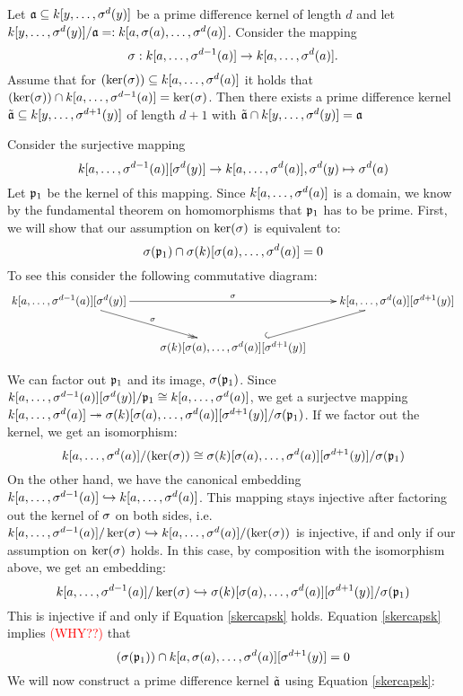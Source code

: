  
\begin{prop}
Let $\mathfrak{a} \subseteq k[y,\ldots,\sigma^d(y)]$ be a prime difference kernel of length $d$ and let $k[y,\ldots,\sigma^d(y)]/\mathfrak{a} =: k[a,\sigma(a),\ldots,\sigma^d(a)]$. Consider the mapping 
\[ \sigma: k[a,\ldots,\sigma^{d-1}(a)] \rightarrow k[a,\ldots,\sigma^d(a)]. \]
Assume that for $(\operatorname{ker}(\sigma)) \subseteq k[a,\ldots,\sigma^d(a)]$ it holds that $(\operatorname{ker}(\sigma)) \cap k[a,\ldots,\sigma^{d-1}(a)] = \operatorname{ker}(\sigma)$. 
Then there exists a prime difference kernel $\tilde {\mathfrak{a}} \subseteq k[y,\ldots,\sigma^{d+1}(y)]$ of length $d+1$ with $\tilde {\mathfrak{a}} \cap k[y,\ldots,\sigma^d(y)] = \mathfrak{a}$
\begin{bew}
Consider the surjective mapping 
\[ k[a,\ldots,\sigma^{d-1}(a)][\sigma^d(y)] \rightarrow k[a,\ldots,\sigma^d(a)], \sigma^d(y) \mapsto \sigma^d(a) \]
Let $\mathfrak{p}_1$ be the kernel of this mapping. Since $k[a,\ldots,\sigma^d(a)]$ is a domain, we know by the fundamental theorem on homomorphisms that $\mathfrak{p}_1$ has to be prime. 
First, we will show that our assumption on $\operatorname{ker}(\sigma)$ is equivalent to:
\begin{equation}\label{skercapsk} \sigma(\mathfrak{p}_1) \cap \sigma(k)[\sigma(a),\ldots,\sigma^d(a)] = 0 \end{equation}
To see this consider the following commutative diagram:
\[
\begin{xy}
 \xymatrix{
      k[a,\ldots,\s^{d-1}(a)][\s^d(y)] \ar[rr]^\s \ar@{->>}[rd]^\s  &     &  k[a,\ldots,\s^d(a)][\s^{d+1}(y)]   \\
      &  \s(k)[\s(a),\ldots,\s^d(a)][\s^{d+1}(y)] \ar@^{(->}[ur] &  }
\end{xy}
\]

We can factor out $\mathfrak{p}_1$ and its image, $\sigma(\mathfrak{p}_1)$. Since $k[a,\ldots,\sigma^{d-1}(a)][\sigma^d(y)] / \mathfrak{p}_1 \cong k[a,\ldots, \sigma^d(a)]$,
we get a surjectve mapping $k[a,\ldots, \sigma^d(a)] \twoheadrightarrow \sigma(k)[\sigma(a),\ldots,\sigma^d(a)][\sigma^{d+1}(y)]/\sigma(\mathfrak{p}_1)$.
If we factor out the kernel, we get an isomorphism:
\[ k[a,\ldots, \sigma^d(a)]/(\operatorname{ker}(\sigma)) \cong \sigma(k)[\sigma(a),\ldots,\sigma^d(a)][\sigma^{d+1}(y)]/\sigma(\mathfrak{p}_1)\]
On the other hand, we have the canonical embedding $k[a,\ldots,\sigma^{d-1}(a)] \hookrightarrow k[a,\ldots,\sigma^{d}(a)]$.
This mapping stays injective after factoring out the kernel of $\sigma$ on both sides, 
i.e. $k[a,\ldots,\sigma^{d-1}(a)]/\operatorname{ker}(\sigma) \hookrightarrow k[a,\ldots,\sigma^{d}(a)]/(\operatorname{ker}(\sigma))$ is injective, if and only if our assumption on $\ker(\sigma)$ holds.
In this case, by composition with the isomorphism above, we get an embedding:
\[ k[a,\ldots,\sigma^{d-1}(a)]/\operatorname{ker}(\sigma) \hookrightarrow \sigma(k)[\sigma(a),\ldots,\sigma^d(a)][\sigma^{d+1}(y)]/\sigma(\mathfrak{p}_1) \]
This is injective if and only if Equation \ref{skercapsk} holds.
Equation \ref{skercapsk} implies \textcolor{red}{(WHY??)} that
\begin{equation}\label{skercapk}
(\sigma(\mathfrak{p}_1)) \cap k[a,\sigma(a),\ldots,\sigma^d(a)][\sigma^{d+1}(y)] = 0
\end{equation}
We will now construct a prime difference kernel $\tilde {\mathfrak{a}}$ using Equation \ref{skercapsk}:


\end{bew}
\end{prop}
